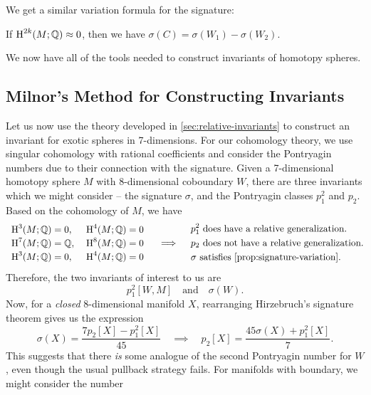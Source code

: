We get a similar variation formula for the signature:

\begin{proposition}\label{prop:signature-variation}
	If $\operatorname{H}^{2k}(M; \mathbb{Q})\approx 0$, then we have $\sigma(C)=\sigma(W_1)-\sigma(W_2)$.
\end{proposition}

We now have all of the tools needed to construct invariants of homotopy spheres.

\subsection{Milnor's Method for Constructing Invariants}\label{sec:milnor-method}

Let us now use the theory developed in \cref{sec:relative-invariants} to construct an invariant for exotic spheres in 7-dimensions. For our cohomology theory, we use singular cohomology with rational coefficients and consider the Pontryagin numbers due to their connection with the signature.
Given a 7-dimensional homotopy sphere $M$ with 8-dimensional coboundary $W$, there are three invariants which we might consider -- the signature $\sigma$, and the Pontryagin classes $p_1^2$ and $p_2$.
Based on the cohomology of $M$, we have
\[
	\renewcommand{\arraystretch}{1.2}
	\begin{array}{r@{\;}l@{\;}l@{\;}}
		\H^3(M; \Q) & =0,  & \quad \H^4(M; \Q)=0 \\
		\H^7(M; \Q) & =\Q, & \quad \H^8(M; \Q)=0 \\
		\H^3(M; \Q) & =0,  & \quad \H^4(M; \Q)=0
	\end{array}
	\quad\implies\quad
	\begin{aligned}
		 & p_1^2\textrm{ does have a relative generalization.}        \\
		 & p_2\textrm{ does not have a relative generalization.}      \\
		 & \sigma\textrm{ satisfies \cref{prop:signature-variation}.}
	\end{aligned}
\]
Therefore, the two invariants of interest to us are
\[
	p_1^2[W,M]
	\quad\textrm{and}\quad
	\sigma(W).
\]
Now, for a \emph{closed} $8$-dimensional manifold $X$, rearranging Hirzebruch's signature theorem gives us the expression
\begin{equation}\label{eq:7-manifold_rearrangement}
	\sigma(X) = \frac{7p_2[X] - p_1^2[X]}{45}
	\quad\implies\quad
	p_2[X] = \frac{45\sigma(X) + p_1^2[X]}{7}.
\end{equation}
This suggests that there \emph{is} some analogue of the second Pontryagin number for $W$, even though the usual pullback strategy fails. For manifolds with boundary, we might consider the number

